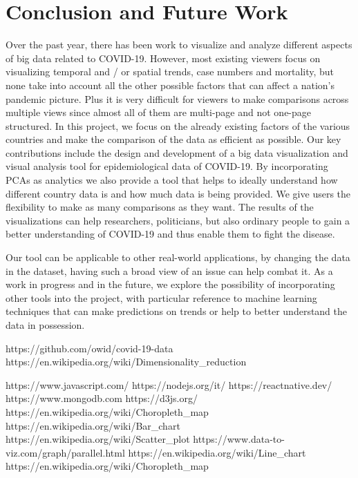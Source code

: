 \documentclass[10pt,conference]{IEEEtran}
\begin{document}
\section{Conclusion and Future Work}
Over the past year, there has been work to visualize and analyze different aspects of big data related to COVID-19. However, most existing viewers focus on visualizing temporal and / or spatial trends, case numbers and mortality, but none take into account all the other possible factors that can affect a nation's pandemic picture. Plus it is very difficult for viewers to make comparisons across multiple views since almost all of them are multi-page and not one-page structured. In this project, we focus on the already existing factors of the various countries and make the comparison of the data as efficient as possible. Our key contributions include the design and development of a big data visualization and visual analysis tool for epidemiological data of COVID-19. By incorporating PCAs as analytics we also provide a tool that helps to ideally understand how different country data is and how much data is being provided. We give users the flexibility to make as many comparisons as they want. The results of the visualizations can help researchers, politicians, but also ordinary people to gain a better understanding of COVID-19 and thus enable them to fight the disease.

Our tool can be applicable to other real-world applications, by changing the data in the dataset, having such a broad view of an issue can help combat it. As a work in progress and in the future, we explore the possibility of incorporating other tools into the project, with particular reference to machine learning techniques that can make predictions on trends or help to better understand the data in possession.


\begin{thebibliography}{00}

 https://github.com/owid/covid-19-data
 https://en.wikipedia.org/wiki/Dimensionality\_reduction

 https://www.javascript.com/
 https://nodejs.org/it/
 https://reactnative.dev/
 https://www.mongodb.com
 https://d3js.org/
 https://en.wikipedia.org/wiki/Choropleth\_map
 https://en.wikipedia.org/wiki/Bar\_chart
 https://en.wikipedia.org/wiki/Scatter\_plot
 https://www.data-to-viz.com/graph/parallel.html
 https://en.wikipedia.org/wiki/Line\_chart
 https://en.wikipedia.org/wiki/Choropleth\_map

\end{thebibliography}
\end{document}
